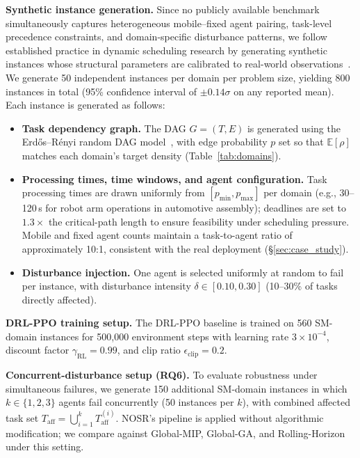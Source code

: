 \documentclass[manuscript,screen,review]{acmart}
\begin{document}
\noindent\textbf{Synthetic instance generation.}
Since no publicly available benchmark simultaneously captures heterogeneous
mobile--fixed agent pairing, task-level precedence constraints, and
domain-specific disturbance patterns, we follow established practice in
dynamic scheduling research by generating synthetic instances whose
structural parameters are calibrated to real-world
observations~\cite{trentesaux2013benchmarking, tanaev2012scheduling}.
We generate 50 independent instances per domain per problem size,
yielding 800 instances in total (95\% confidence interval of
$\pm 0.14\sigma$ on any reported mean). Each instance is generated as follows:

\begin{itemize}[nosep]
  \item \textbf{Task dependency graph.}
  The DAG $G=(T,E)$ is generated using the Erd\H{o}s--R\'{e}nyi random
  DAG model~\cite{krapivsky2024simple}, with edge probability $p$ set so
  that $\mathbb{E}[\rho]$ matches each domain's target density
  (Table~\ref{tab:domains}).

  \item \textbf{Processing times, time windows, and agent configuration.}
  Task processing times are drawn uniformly from $[p_{\min}, p_{\max}]$
  per domain (e.g., 30--120\,s for robot arm operations in automotive
  assembly); deadlines are set to $1.3\times$ the critical-path length
  to ensure feasibility under scheduling pressure. Mobile and fixed agent
  counts maintain a task-to-agent ratio of approximately 10:1, consistent
  with the real deployment (§\ref{sec:case_study}).

  \item \textbf{Disturbance injection.}
  One agent is selected uniformly at random to fail per instance, with
  disturbance intensity $\delta \in [0.10, 0.30]$ (10--30\% of tasks
  directly affected).
\end{itemize}

\noindent\textbf{DRL-PPO training setup.}
The DRL-PPO baseline is trained on 560 SM-domain instances for 500{,}000
environment steps with learning rate $3\times10^{-4}$, discount factor
$\gamma_{\mathrm{RL}}=0.99$, and clip ratio $\epsilon_{\mathrm{clip}}=0.2$.

\noindent\textbf{Concurrent-disturbance setup (RQ6).}
To evaluate robustness under simultaneous failures, we generate 150 additional
SM-domain instances in which $k \in \{1,2,3\}$ agents fail concurrently
(50 instances per $k$), with combined affected task set
$T_{\mathrm{aff}} = \bigcup_{i=1}^{k} T_{\mathrm{aff}}^{(i)}$.
NOSR's pipeline is applied without algorithmic modification; we compare against
Global-MIP, Global-GA, and Rolling-Horizon under this setting.
\end{document}
